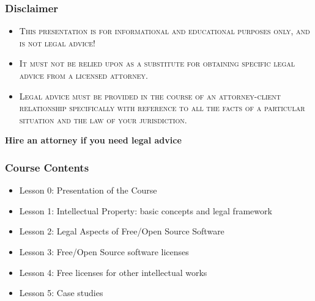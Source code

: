 \documentclass{beamer}
\begin{document}
\begin{frame}
\frametitle{Disclaimer}

\begin{itemize}
\item \textsc{This presentation is for \alert{informational} and \alert{educational purposes only}, and \alert{is not legal advice!}}
\item \textsc{It must not be relied upon as a substitute for obtaining specific legal advice from a licensed attorney.}
\item \textsc{Legal advice must be provided in the course of an attorney-client relationship specifically with reference to \alert{all the facts of a particular situation} and the \alert{law of your jurisdiction}.} 
\end{itemize}

\begin{center}
\textbf{Hire an attorney if you need legal advice}
\end{center}

\end{frame}





\begin{frame}
  \frametitle{Course Contents}

  \begin{itemize}
    \item Lesson 0: Presentation of the Course
    \item Lesson 1: Intellectual Property: basic concepts and legal framework
    \item Lesson 2: Legal Aspects of Free/Open Source Software
    \item Lesson 3: Free/Open Source software licenses
    \item Lesson 4: Free licenses for other intellectual works
    \item \alert{Lesson 5: Case studies}
  \end{itemize}

\end{frame}
\end{document}
